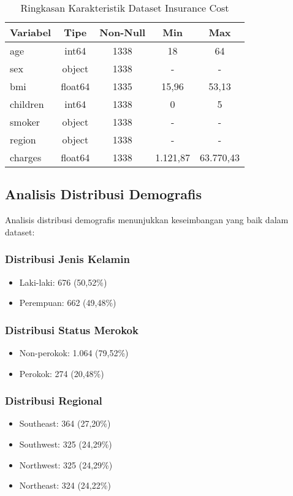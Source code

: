 \begin{table}[H]
\centering
\caption{Ringkasan Karakteristik Dataset Insurance Cost}
\label{tab:dataset-summary}
\begin{tabular}{|l|c|c|c|c|}
\hline
\textbf{Variabel} & \textbf{Tipe} & \textbf{Non-Null} & \textbf{Min} & \textbf{Max} \\
\hline
age & int64 & 1338 & 18 & 64 \\
sex & object & 1338 & - & - \\
bmi & float64 & 1335 & 15,96 & 53,13 \\
children & int64 & 1338 & 0 & 5 \\
smoker & object & 1338 & - & - \\
region & object & 1338 & - & - \\
charges & float64 & 1338 & 1.121,87 & 63.770,43 \\
\hline
\end{tabular}
\end{table}

\subsection{Analisis Distribusi Demografis}
\label{subsec:distribusi-demografis}

Analisis distribusi demografis menunjukkan keseimbangan yang baik dalam dataset:

\subsubsection{Distribusi Jenis Kelamin}
\begin{itemize}
    \item Laki-laki: 676 (50,52\%)
    \item Perempuan: 662 (49,48\%)
\end{itemize}

\subsubsection{Distribusi Status Merokok}
\begin{itemize}
    \item Non-perokok: 1.064 (79,52\%)
    \item Perokok: 274 (20,48\%)
\end{itemize}

\subsubsection{Distribusi Regional}
\begin{itemize}
    \item Southeast: 364 (27,20\%)
    \item Southwest: 325 (24,29\%)
    \item Northwest: 325 (24,29\%)
    \item Northeast: 324 (24,22\%)
\end{itemize}

